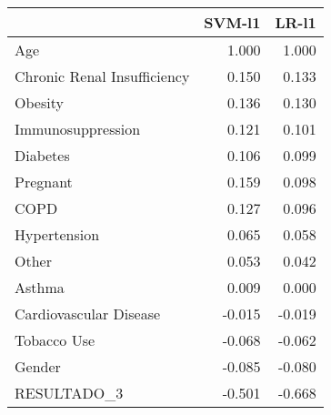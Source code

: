 \begin{tabular}{lrr}
\toprule
{} &  SVM-l1 &  LR-l1 \\
\midrule
Age                         &   1.000 &  1.000 \\
Chronic Renal Insufficiency &   0.150 &  0.133 \\
Obesity                     &   0.136 &  0.130 \\
Immunosuppression           &   0.121 &  0.101 \\
Diabetes                    &   0.106 &  0.099 \\
Pregnant                    &   0.159 &  0.098 \\
COPD                        &   0.127 &  0.096 \\
Hypertension                &   0.065 &  0.058 \\
Other                       &   0.053 &  0.042 \\
Asthma                      &   0.009 &  0.000 \\
Cardiovascular Disease      &  -0.015 & -0.019 \\
Tobacco Use                 &  -0.068 & -0.062 \\
Gender                      &  -0.085 & -0.080 \\
RESULTADO\_3                 &  -0.501 & -0.668 \\
\bottomrule
\end{tabular}

